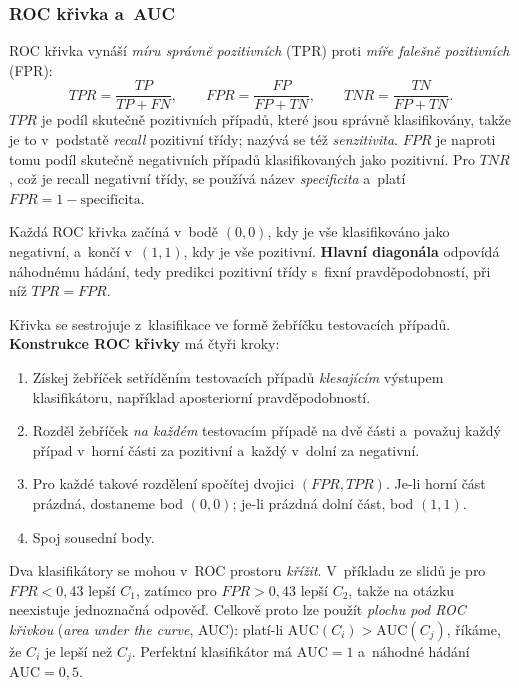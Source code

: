 \documentclass[11pt,a4paper]{article}
\theoremstyle{definition}
\begin{document}
\subsubsection{ROC křivka a~AUC}

\begin{defbox}
ROC křivka vynáší \emph{míru správně pozitivních} (TPR) proti \emph{míře falešně pozitivních}
(FPR):
\[ \mathit{TPR}=\frac{TP}{TP+FN},\qquad \mathit{FPR}=\frac{FP}{FP+TN},\qquad
   \mathit{TNR}=\frac{TN}{FP+TN}. \]
$\mathit{TPR}$ je podíl skutečně pozitivních případů, které jsou správně klasifikovány, takže
je to v~podstatě \emph{recall} pozitivní třídy; nazývá se též \emph{senzitivita}.
$\mathit{FPR}$ je naproti tomu podíl skutečně negativních případů klasifikovaných jako
pozitivní. Pro $\mathit{TNR}$, což je recall negativní třídy, se používá název
\emph{specificita} a~platí $\mathit{FPR}=1-\text{specificita}$.

Každá ROC křivka začíná v~bodě $(0,0)$, kdy je vše klasifikováno jako negativní, a~končí
v~$(1,1)$, kdy je vše pozitivní. \textbf{Hlavní diagonála} odpovídá náhodnému hádání, tedy
predikci pozitivní třídy s~fixní pravděpodobností, při níž $\mathit{TPR}=\mathit{FPR}$.
\end{defbox}

Křivka se sestrojuje z~klasifikace ve formě žebříčku testovacích případů. \textbf{Konstrukce
ROC křivky} má čtyři kroky:
\begin{enumerate}
\item Získej žebříček setříděním testovacích případů \emph{klesajícím} výstupem klasifikátoru,
      například aposteriorní pravděpodobností.
\item Rozděl žebříček \emph{na každém} testovacím případě na dvě části a~považuj každý případ
      v~horní části za pozitivní a~každý v~dolní za negativní.
\item Pro každé takové rozdělení spočítej dvojici $(\mathit{FPR},\mathit{TPR})$. Je-li horní
      část prázdná, dostaneme bod $(0,0)$; je-li prázdná dolní část, bod $(1,1)$.
\item Spoj sousední body.
\end{enumerate}

\begin{defbox}
Dva klasifikátory se mohou v~ROC prostoru \emph{křížit}. V~příkladu ze slidů je pro
$\mathit{FPR}<0{,}43$ lepší $C_1$, zatímco pro $\mathit{FPR}>0{,}43$ lepší $C_2$, takže na
otázku  neexistuje jednoznačná odpověď. Celkově proto lze použít
\emph{plochu pod ROC křivkou} (\emph{area under the curve}, AUC): platí-li
$\mathrm{AUC}(C_i)>\mathrm{AUC}(C_j)$, říkáme, že $C_i$ je lepší než $C_j$. Perfektní
klasifikátor má $\mathrm{AUC}=1$ a~náhodné hádání $\mathrm{AUC}=0{,}5$.
\end{defbox}
\end{document}
